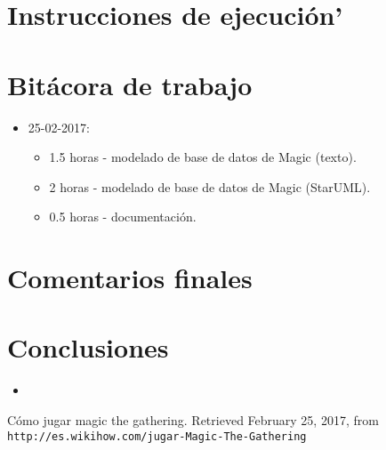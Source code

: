 \documentclass{IEEEtran}
\begin{document}
\section{Instrucciones de ejecuci\'on'}

\section{Bit\'acora de trabajo}
\begin{itemize}
  \item 25-02-2017:
  \begin{itemize}
    \item 1.5 horas - modelado de base de datos de Magic (texto).
    \item 2 horas   - modelado de base de datos de Magic (StarUML).
    \item 0.5 horas - documentaci\'on.
  \end{itemize}
\end{itemize}

\section{Comentarios finales}

\section{Conclusiones}

\begin{itemize}
  \item 
\end{itemize}

\begin{thebibliography}{99}
  Cómo jugar magic the gathering. Retrieved February 25, 2017, from  \texttt{http://es.wikihow.com/jugar-Magic-The-Gathering}
\end{thebibliography}
\end{document}
